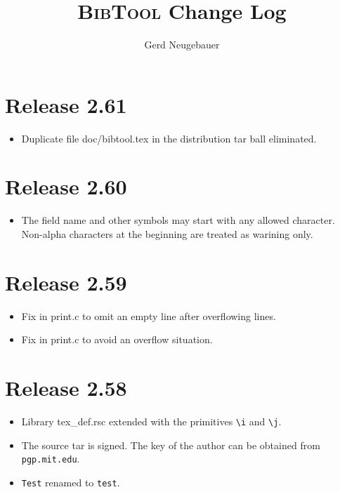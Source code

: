 \documentclass[11pt,a4paper]{scrartcl}
\newenvironment{Developers}{}{}
\newcommand\Developer[3]{}
\newcommand\File[1]{\textsf{#1}}
\newcommand\BibTool{\textsc{BibTool}}
\newenvironment{Release}[2]{\section*{Release #1}\begin{itemize}}{\end{itemize}}
\newenvironment{Fix}[1]{\item }{}
\newenvironment{Update}[1]{\item }{}
\begin{document}

\title{\BibTool{} Change Log}
\author{Gerd Neugebauer}
\maketitle

\begin{Developers}
  \Developer{gene}{Gerd Neugebauer}{gene@gerd-neugebauer.de}
\end{Developers}

 \begin{Release}{2.61}{???}
  \begin{Fix}{gene}
    Duplicate file \File{doc/bibtool.tex} in the distribution tar ball
    eliminated.
  \end{Fix}
 \end{Release}

 \begin{Release}{2.60}{June 9, 2015}
  \begin{Fix}{gene}
    The field name and other symbols may start with any allowed character.
    Non-alpha characters at the beginning are treated as warining only.
  \end{Fix}
 \end{Release}

 \begin{Release}{2.59}{March 14, 2015}
  \begin{Fix}{gene}
    Fix in \File{print.c} to omit an empty line after overflowing lines.
  \end{Fix}
  \begin{Fix}{gene}
    Fix in \File{print.c} to avoid an overflow situation.
  \end{Fix}
 \end{Release}

 \begin{Release}{2.58}{February 9, 2015}
  \begin{Update}{gene}
    Library \File{tex\_def.rsc} extended with the primitives \verb|\i| and
    \verb|\j|.
  \end{Update}
  \begin{Update}{gene}
    The source tar is signed. The key of the author can be obtained
    from \texttt{pgp.mit.edu}.
  \end{Update}
  \begin{Update}{gene}
    \texttt{Test} renamed to \texttt{test}.
  \end{Update}
 \end{Release}
\end{document}
